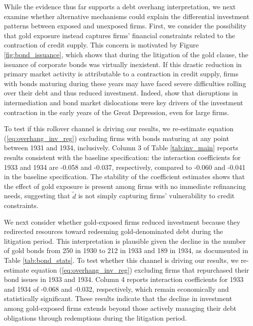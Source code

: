 While the evidence thus far supports a debt overhang interpretation, we next examine whether alternative mechanisms could explain the differential investment patterns between exposed and unexposed firms. First, we consider the possibility that gold exposure instead captures firms' financial constraints related to the contraction of credit supply. This concern is motivated by Figure \ref{fig:bond_issuance}, which shows that during the litigation of the gold clause, the issuance of corporate bonds was virtually inexistent. If this drastic reduction in primary market activity is attributable to a contraction in credit supply, firms with bonds maturing during these years may have faced severe difficulties rolling over their debt and thus reduced investment. Indeed, \cite{Benmelech2018} show that disruptions in intermediation and bond market dislocations were key drivers of the investment contraction in the early years of the Great Depression, even for large firms. 

To test if this rollover channel is driving our results, we re-estimate equation (\ref{eq:overhang_inv_reg}) excluding firms with bonds maturing at any point between 1931 and 1934, inclusively. Column 3 of Table \ref{tab:inv_main} reports results consistent with the baseline specification: the interaction coefficients for 1933 and 1934 are -0.058 and -0.037, respectively, compared to -0.060 and -0.041 in the baseline specification. The stability of the coefficient estimates shows that the effect of gold exposure is present among firms with no immediate refinancing needs, suggesting that $\tilde{d}$ is not simply capturing firms' vulnerability to credit constraints.

We next consider whether gold-exposed firms reduced investment because they redirected resources toward redeeming gold-denominated debt during the litigation period. This interpretation is plausible given the decline in the number of gold bonds from 250 in 1930 to 212 in 1933 and 189 in 1934, as documented in Table \ref{tab:bond_stats}. To test whether this channel is driving our results, we re-estimate equation (\ref{eq:overhang_inv_reg}) excluding firms that repurchased their bond issues in 1933 and 1934. Column 4 reports interaction coefficients for 1933 and 1934 of -0.068 and -0.032, respectively, which remain economically and statistically significant. These results indicate that the decline in investment among gold-exposed firms extends beyond those actively managing their debt obligations through redemptions during the litigation period.

